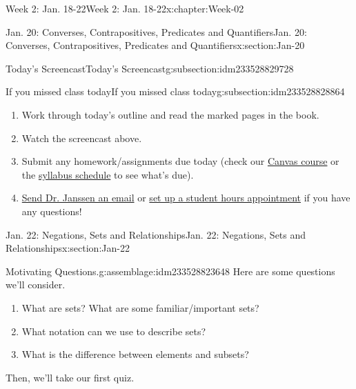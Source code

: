 \documentclass[oneside,10pt,]{book}
\numberwithin{equation}{section}
\begin{document}
\begin{chapterptx}{Week 2: Jan. 18-22}{}{Week 2: Jan. 18-22}{}{}{x:chapter:Week-02}
\begin{sectionptx}{Jan. 20: Converses, Contrapositives, Predicates and Quantifiers}{}{Jan. 20: Converses, Contrapositives, Predicates and Quantifiers}{}{}{x:section:Jan-20}
\begin{subsectionptx}{Today's Screencast}{}{Today's Screencast}{}{}{g:subsection:idm233528829728}
\end{subsectionptx}
%
%
\typeout{************************************************}
\typeout{************************************************}
%
\begin{subsectionptx}{If you missed class today}{}{If you missed class today}{}{}{g:subsection:idm233528828864}
%
\begin{enumerate}
\item{}Work through today's outline and read the marked pages in the book.%
\item{}Watch the screencast above.%
\item{}Submit any homework\slash{}assignments due today (check our \href{https://dordt.instructure.com/courses/3110050}{Canvas course} or the \href{https://prof.mkjanssen.org/ds/index.html\#schedule}{syllabus schedule} to see what's due).%
\item{}\href{mailto:mike.janssen@dordt.edu}{Send Dr. Janssen an email} or \href{https://calendly.com/mkjanssen/student-hours}{set up a student hours appointment} if you have any questions!%
\end{enumerate}
\end{subsectionptx}
\end{sectionptx}
%
%
\typeout{************************************************}
\typeout{************************************************}
%
\begin{sectionptx}{Jan. 22: Negations, Sets and Relationships}{}{Jan. 22: Negations, Sets and Relationships}{}{}{x:section:Jan-22}
\begin{introduction}{}%
\begin{assemblage}{Motivating Questions.}{g:assemblage:idm233528823648}%
Here are some questions we'll consider. %
\begin{enumerate}
\item{}What are sets? What are some familiar\slash{}important sets?%
\item{}What notation can we use to describe sets?%
\item{}What is the difference between elements and subsets?%
\end{enumerate}
 Then, we'll take our first quiz.%
\end{assemblage}
\end{introduction}%
%
%
\typeout{************************************************}
\typeout{************************************************}

\end{sectionptx}
\end{chapterptx}
\end{document}
